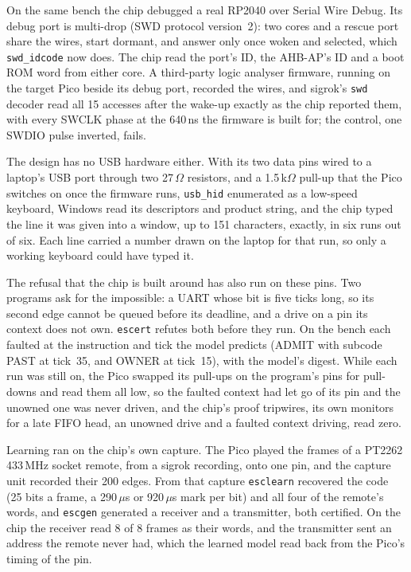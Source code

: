 \documentclass[conference,letterpaper]{IEEEtran}
\begin{document}
On the same bench the chip debugged a real RP2040 over Serial Wire Debug. Its debug port
is multi-drop (SWD protocol version~2): two cores and a rescue port share the wires, start
dormant, and answer only once woken and selected, which \texttt{swd\_idcode} now does. The
chip read the port's ID, the AHB-AP's ID and a boot ROM word from either core. A
third-party logic analyser firmware, running on the target Pico beside its debug port,
recorded the wires, and sigrok's \texttt{swd} decoder read all 15 accesses after the
wake-up exactly as the chip reported them, with every SWCLK phase at the 640\,ns the
firmware is built for; the control, one SWDIO pulse inverted, fails.

The design has no USB hardware either. With its two data pins wired to a laptop's USB port
through two 27\,$\Omega$ resistors, and a 1.5\,k$\Omega$ pull-up that the Pico switches on
once the firmware runs, \texttt{usb\_hid} enumerated as a low-speed keyboard, Windows read
its descriptors and product string, and the chip typed the line it was given into a
window, up to 151 characters, exactly, in six runs out of six. Each line carried a number
drawn on the laptop for that run, so only a working keyboard could have typed it.

The refusal that the chip is built around has also run on these pins. Two programs ask for
the impossible: a UART whose bit is five ticks long, so its second edge cannot be queued
before its deadline, and a drive on a pin its context does not own. \texttt{escert} refutes
both before they run. On the bench each faulted at the instruction and tick the model
predicts (ADMIT with subcode PAST at tick~35, and OWNER at tick~15), with the model's
digest. While each run was still on, the Pico swapped its pull-ups on the program's pins
for pull-downs and read them all low, so the faulted context had let go of its pin and the
unowned one was never driven, and the chip's proof tripwires, its own monitors for a late
FIFO head, an unowned drive and a faulted context driving, read zero.

Learning ran on the chip's own capture. The Pico played the frames of a PT2262 433\,MHz
socket remote, from a sigrok recording, onto one pin, and the capture unit recorded their
200 edges. From that capture \texttt{esclearn} recovered the code (25 bits a frame, a
290\,$\mu$s or 920\,$\mu$s mark per bit) and all four of the remote's words, and
\texttt{escgen} generated a receiver and a transmitter, both certified. On the chip the
receiver read 8 of 8 frames as their words, and the transmitter sent an address the remote
never had, which the learned model read back from the Pico's timing of the pin.
\end{document}
